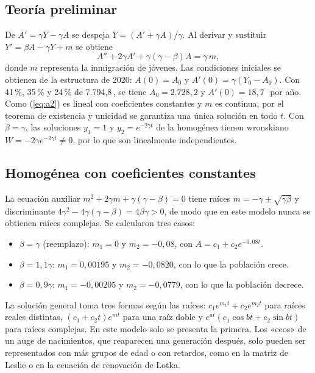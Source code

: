 \documentclass[10pt,twocolumn,letterpaper]{article}
\newcommand{\M}{\,\text{M}}
\begin{document}
\subsection{Teoría preliminar}
De $A'=\gamma Y-\gamma A$ se despeja $Y=(A'+\gamma A)/\gamma$. Al derivar y sustituir $Y'=\beta A-\gamma Y+m$ se obtiene
\begin{equation}
A''+2\gamma A'+\gamma(\gamma-\beta)A=\gamma\,m,\label{eq:a2}
\end{equation}
donde $m$ representa la inmigración de jóvenes. Las condiciones iniciales se obtienen de la estructura de 2020: $A(0)=A_0$ y $A'(0)=\gamma(Y_0-A_0)$. Con 41\,\%, 35\,\% y 24\,\% de 7.794,8\M, se tiene $A_0=2.728{,}2$ y $A'(0)=18{,}7$\M\ por año. Como (\ref{eq:a2}) es lineal con coeficientes constantes y $m$ es continua, por el teorema de existencia y unicidad se garantiza una única solución en todo $t$. Con $\beta=\gamma$, las soluciones $y_1=1$ y $y_2=e^{-2\gamma t}$ de la homogénea tienen wronskiano $W=-2\gamma e^{-2\gamma t}\neq0$, por lo que son linealmente independientes.

\subsection{Homogénea con coeficientes constantes}
La ecuación auxiliar $m^2+2\gamma m+\gamma(\gamma-\beta)=0$ tiene raíces $m=-\gamma\pm\sqrt{\gamma\beta}$ y discriminante $4\gamma^2-4\gamma(\gamma-\beta)=4\beta\gamma>0$, de modo que en este modelo nunca se obtienen raíces complejas. Se calcularon tres casos:
\begin{itemize}
\item $\beta=\gamma$ (reemplazo): $m_1=0$ y $m_2=-0{,}08$, con $A=c_1+c_2e^{-0{,}08t}$.
\item $\beta=1{,}1\gamma$: $m_1=0{,}00195$ y $m_2=-0{,}0820$, con lo que la población crece.
\item $\beta=0{,}9\gamma$: $m_1=-0{,}00205$ y $m_2=-0{,}0779$, con lo que la población decrece.
\end{itemize}
La solución general toma tres formas según las raíces: $c_1e^{m_1t}+c_2e^{m_2t}$ para raíces reales distintas, $(c_1+c_2t)e^{mt}$ para una raíz doble y $e^{at}(c_1\cos bt+c_2\sin bt)$ para raíces complejas. En este modelo solo se presenta la primera. Los «ecos» de un auge de nacimientos, que reaparecen una generación después, solo pueden ser representados con más grupos de edad o con retardos, como en la matriz de Leslie o en la ecuación de renovación de Lotka.
\end{document}
